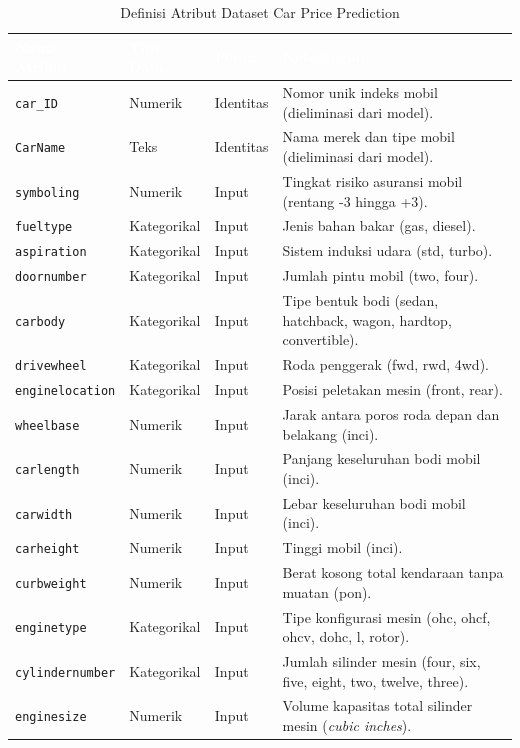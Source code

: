 \documentclass[a4paper,oneside,12pt]{report}
\newcommand{\thead}[1]{\textcolor{white}{\textbf{#1}}}
\begin{document}
\begin{table}[H]
\centering
\caption{Definisi Atribut Dataset Car Price Prediction}
\label{tab:car_attributes}
\vspace{0.2cm}
\footnotesize
{}
\begin{tabularx}{\textwidth}{l l l X}
\toprule
\rowcolor{darkblue}
\thead{Nama Atribut} & \thead{Tipe Data} & \thead{Peran} & \thead{Keterangan} \\
\midrule
\texttt{car\_ID} & Numerik & Identitas & Nomor unik indeks mobil (dieliminasi dari model). \\
\texttt{CarName} & Teks & Identitas & Nama merek dan tipe mobil (dieliminasi dari model). \\
\texttt{symboling} & Numerik & Input & Tingkat risiko asuransi mobil (rentang -3 hingga +3). \\
\texttt{fueltype} & Kategorikal & Input & Jenis bahan bakar (gas, diesel). \\
\texttt{aspiration} & Kategorikal & Input & Sistem induksi udara (std, turbo). \\
\texttt{doornumber} & Kategorikal & Input & Jumlah pintu mobil (two, four). \\
\texttt{carbody} & Kategorikal & Input & Tipe bentuk bodi (sedan, hatchback, wagon, hardtop, convertible). \\
\texttt{drivewheel} & Kategorikal & Input & Roda penggerak (fwd, rwd, 4wd). \\
\texttt{enginelocation} & Kategorikal & Input & Posisi peletakan mesin (front, rear). \\
\texttt{wheelbase} & Numerik & Input & Jarak antara poros roda depan dan belakang (inci). \\
\texttt{carlength} & Numerik & Input & Panjang keseluruhan bodi mobil (inci). \\
\texttt{carwidth} & Numerik & Input & Lebar keseluruhan bodi mobil (inci). \\
\texttt{carheight} & Numerik & Input & Tinggi mobil (inci). \\
\texttt{curbweight} & Numerik & Input & Berat kosong total kendaraan tanpa muatan (pon). \\
\texttt{enginetype} & Kategorikal & Input & Tipe konfigurasi mesin (ohc, ohcf, ohcv, dohc, l, rotor). \\
\texttt{cylindernumber} & Kategorikal & Input & Jumlah silinder mesin (four, six, five, eight, two, twelve, three). \\
\texttt{enginesize} & Numerik & Input & Volume kapasitas total silinder mesin (\textit{cubic inches}). \\

\end{tabularx}
\end{table}
\end{document}
